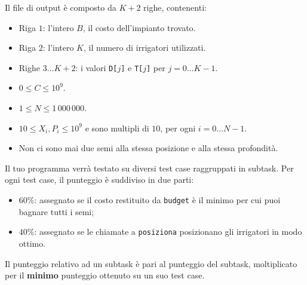 Il file di output è composto da $K+2$ righe, contenenti:
\begin{itemize}[nolistsep,itemsep=2mm]
\item Riga $1$: l'intero $B$, il costo dell'impianto trovato.
\item Riga $2$: l'intero $K$, il numero di irrigatori utilizzati.
\item Righe $3\ldots K+2$: i valori \texttt{D[$j$]} e \texttt{T[$j$]} per $j = 0\ldots K-1$.
\end{itemize}



\Constraints

\begin{itemize}[nolistsep, itemsep=2mm]
	\item $0 \le C \le 10^9$.
	\item $1 \le N \le 1\,000\,000$.
	\item $10 \le X_i, P_i \le 10^9$ e sono multipli di $10$, per ogni $i=0\ldots N-1$.
	\item Non ci sono mai due semi alla stessa posizione e alla stessa profondità.
\end{itemize}


\pagebreak

\Scoring

Il tuo programma verrà testato su diversi test case raggruppati in subtask.
Per ogni test case, il punteggio è suddiviso in due parti:

\begin{itemize}[nolistsep,itemsep=2mm]
  \item $60\%$: assegnato se il costo restituito da \verb|budget| è il minimo per cui puoi bagnare tutti i semi;
  \item $40\%$: assegnato se le chiamate a \verb|posiziona| posizionano gli irrigatori in modo ottimo.
\end{itemize}

Il punteggio relativo ad un subtask è pari al punteggio del subtask, moltiplicato per il \textbf{minimo} punteggio ottenuto su un suo test case.

